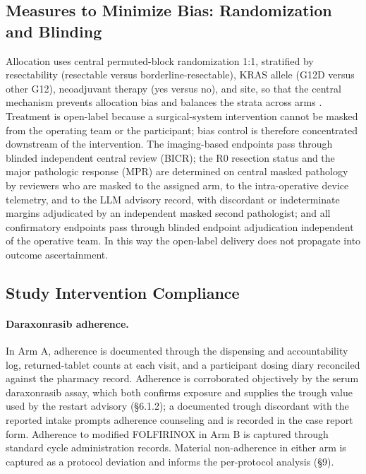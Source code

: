 \subsection{Measures to Minimize Bias: Randomization and Blinding}

Allocation uses central permuted-block randomization 1:1, stratified by resectability
(resectable versus borderline-resectable), KRAS allele (G12D versus other G12),
neoadjuvant therapy (yes versus no), and site, so that the central mechanism prevents
allocation bias and balances the strata across arms \cite{Schulz2010consort}.
Treatment is open-label because a surgical-system intervention cannot be masked from
the operating team or the participant; bias control is therefore concentrated
downstream of the intervention. The imaging-based endpoints pass through blinded
independent central review (BICR); the R0 resection status and the major pathologic
response (MPR) are determined on central masked pathology by reviewers who are masked
to the assigned arm, to the intra-operative device telemetry, and to the LLM advisory
record, with discordant or indeterminate margins adjudicated by an independent masked
second pathologist; and all confirmatory endpoints pass through blinded endpoint
adjudication independent of the operative team. In this way the open-label delivery
does not propagate into outcome ascertainment.

\subsection{Study Intervention Compliance}

\paragraph{Daraxonrasib adherence.}
In Arm A, adherence is documented through the dispensing and accountability log,
returned-tablet counts at each visit, and a participant dosing diary reconciled
against the pharmacy record. Adherence is corroborated objectively by the serum
daraxonrasib assay, which both confirms exposure and supplies the trough value used
by the restart advisory (\S6.1.2); a documented trough discordant with the reported
intake prompts adherence counseling and is recorded in the case report form.
Adherence to modified FOLFIRINOX in Arm B is captured through standard cycle
administration records. Material non-adherence in either arm is captured as a
protocol deviation and informs the per-protocol analysis (\S9).

